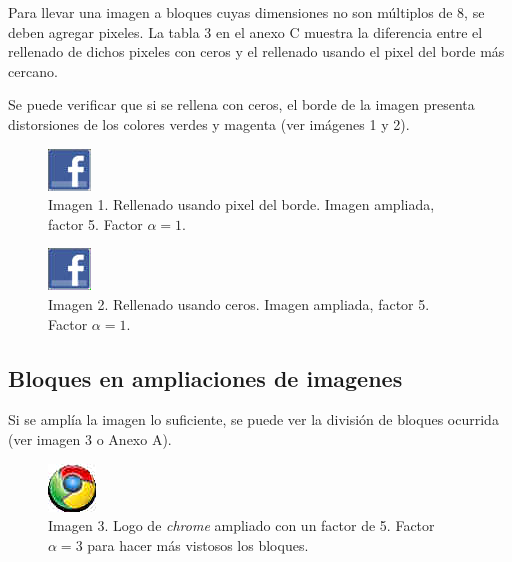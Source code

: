 \documentclass[%
	final,
	reprint,
	notitlepage,
	narroweqnarray,
	inline,
	twoside,
	invited
	]{ieee}
\begin{document}
Para llevar una imagen a bloques cuyas dimensiones no son múltiplos de 8, se deben agregar pixeles. La 
tabla 3 en el anexo C muestra la diferencia entre el rellenado de dichos pixeles con ceros y el rellenado usando 
el pixel del borde más cercano.


\par Se puede verificar que si se rellena con ceros, el borde de la imagen presenta distorsiones de los 
colores verdes y magenta (ver imágenes 1 y 2).

\begin{figure}[H]
\centering
	\includegraphics[scale=3]{./img/facebookout.png}
	\caption{Imagen 1. Rellenado usando pixel del borde. Imagen ampliada, factor 5. Factor $\alpha=1$.}
\label{lenna128}
\end{figure}

\begin{figure}[H]
\centering
	\includegraphics[scale=3]{./img/facebookout0.png}
	\caption{Imagen 2. Rellenado usando ceros. Imagen ampliada, factor 5. Factor $\alpha=1$.}
\label{lenna128}
\end{figure}

\subsection{Bloques en ampliaciones de imagenes}

Si se amplía la imagen lo suficiente, se puede ver la división de bloques ocurrida (ver imagen 3 o Anexo A).

\begin{figure}[H]
\centering
	\includegraphics[scale=3]{./img/chrome3out.png}
	\caption{Imagen 3. Logo de \textit{chrome} ampliado con un factor de 5. Factor $\alpha=3$ para hacer más vistosos los bloques.}
\label{lenna128}
\end{figure}



\vspace{0.4cm}
\end{document}
